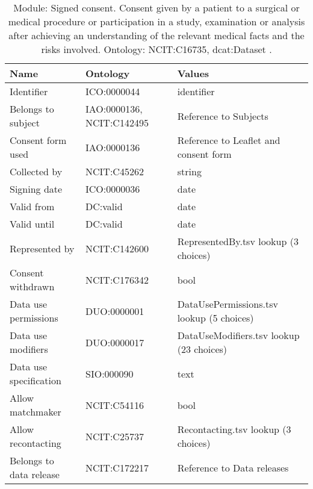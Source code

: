 \documentclass{article}
\begin{document}
\begin{table}[htb]
\begin{tabular}{lll}
Name & Ontology & Values \\
\hline
Identifier & ICO:0000044  & identifier \\
Belongs to subject & IAO:0000136, NCIT:C142495  & Reference to Subjects \\
Consent form used & IAO:0000136  & Reference to Leaflet and consent form \\
Collected by & NCIT:C45262  & string \\
Signing date & ICO:0000036  & date \\
Valid from & DC:valid  & date \\
Valid until & DC:valid  & date \\
Represented by & NCIT:C142600  & RepresentedBy.tsv lookup (3 choices) \\
Consent withdrawn & NCIT:C176342  & bool \\
Data use permissions & DUO:0000001  & DataUsePermissions.tsv lookup (5 choices) \\
Data use modifiers & DUO:0000017  & DataUseModifiers.tsv lookup (23 choices) \\
Data use specification & SIO:000090  & text \\
Allow matchmaker & NCIT:C54116  & bool \\
Allow recontacting & NCIT:C25737  & Recontacting.tsv lookup (3 choices) \\
Belongs to data release & NCIT:C172217  & Reference to Data releases \\
\hline
\end{tabular}
\caption[Module: Signed consent]{\label{table:table13} Module: Signed consent. Consent given by a patient to a surgical or medical procedure or participation in a study, examination or analysis after achieving an understanding of the relevant medical facts and the risks involved. Ontology: NCIT:C16735, dcat:Dataset . }
\end{table}
\end{document}
